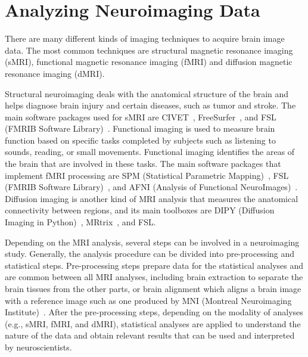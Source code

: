 \section{Analyzing Neuroimaging Data}

There are many different kinds of imaging techniques to acquire 
brain image data. The most common techniques are structural magnetic 
resonance imaging (sMRI), functional magnetic resonance imaging (fMRI) 
and diffusion magnetic resonance imaging (dMRI).

Structural neuroimaging deals with the anatomical structure of the brain and helps
diagnose brain injury and certain diseases, such as tumor and stroke.
The main software packages used for sMRI are 
CIVET~\cite{ad2006civet}, FreeSurfer~\cite{fischl2012freesurfer}, and 
FSL (FMRIB Software Library)~\cite{jenkinson2012fsl}. 
Functional imaging is used to measure brain function based on 
specific tasks completed by subjects such as listening to sounds, 
reading, or small movements. 
Functional imaging identifies the areas of 
the brain that are involved in these tasks. 
The main software packages that implement fMRI processing are SPM (Statistical 
Parametric Mapping)~\cite{spm}, FSL (FMRIB Software Library)~\cite{jenkinson2012fsl},
and AFNI (Analysis of Functional 
NeuroImages)~\cite{cox1996afni}. Diffusion imaging is another kind of 
MRI analysis that measures the anatomical connectivity between 
regions, and its main toolboxes are DIPY (Diffusion Imaging in 
Python)~\cite{garyfallidis2014dipy}, MRtrix~\cite{tournier2012mrtrix}, 
and FSL.

Depending on the MRI analysis, several steps can be involved in a 
neuroimaging study. Generally, the analysis procedure can be divided into 
pre-processing and statistical steps. Pre-processing steps 
prepare data for the statistical analyses and are common between all 
MRI analyses, including brain extraction to separate the brain 
tissues from the other parts, or brain alignment which aligns a brain 
image with a reference image such as one produced by 
MNI (Montreal Neuroimaging Institute)~\cite{evans1992anatomical}. 
After the pre-processing steps, depending on the
modality of analyses (e.g., sMRI, fMRI, and dMRI), statistical analyses 
are applied to understand the nature of the data and obtain relevant
results that can be used and interpreted by neuroscientists.

